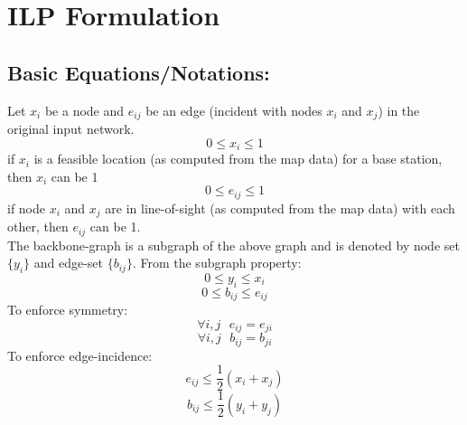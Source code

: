 \documentclass[letterpaper, 12pt]{article}
\begin{document}
\section*{ILP Formulation}
\subsection*{Basic Equations/Notations: }Let $x_{i}$ be a node and $e_{ij}$ be
an edge (incident with nodes $x_i$ and $x_j$) in the original input network. 
\begin{equation}
	0 \leq x_i \leq 1 
\end{equation} 
\indent if $x_i$ is a feasible location (as computed from the map data) for a
base station, then $x_i$ can be 1
\begin{equation}
	0 \leq e_{ij} \leq 1 
\end{equation} 
\indent if node $x_i$ and $x_j$ are in line-of-sight (as computed
	from the map data) with each other, then $e_{ij}$ can be 1.\\
The backbone-graph is a subgraph of the above graph and is denoted by node set
$\{y_i\}$ and edge-set $\{b_{ij}\}$. From the subgraph property:
\begin{equation}
	0 \leq y_{i} \leq x_{i}
\end{equation}
\begin{equation}
	0 \leq b_{ij} \leq e_{ij}
\end{equation}
To enforce symmetry:
\begin{equation}
	\forall i,j \mbox{ } e_{ij} = e_{ji}
\end{equation}
\begin{equation}
	\forall i,j \mbox{ } b_{ij} = b_{ji}
\end{equation}
To enforce edge-incidence:
\begin{equation}
	e_{ij} \leq \frac{1}{2}(x_i + x_j)
\end{equation}
\begin{equation}
	b_{ij} \leq \frac{1}{2}(y_i + y_j)
\end{equation}
\end{document}
